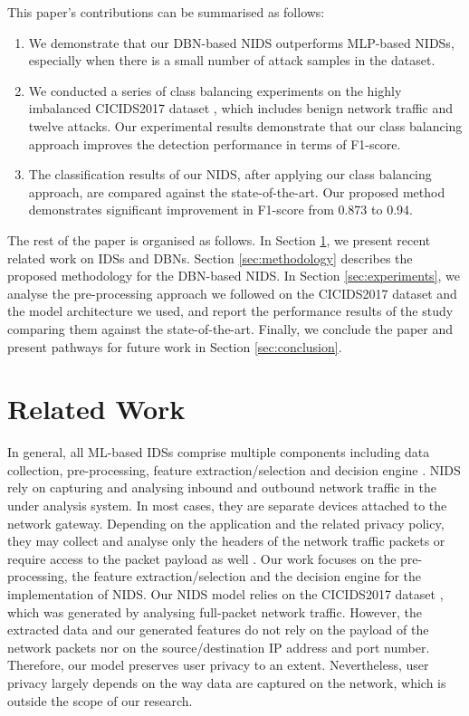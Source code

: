 \documentclass[runningheads]{llncs}
\begin{document}
This paper's contributions can be summarised as follows:
\begin{enumerate}
\item We demonstrate that our \ac{DBN}-based \ac{NIDS} outperforms \ac{MLP}-based \acp{NIDS}, especially when there is a small number of attack samples in the dataset.
\item We conducted a series of class balancing experiments on the highly imbalanced CICIDS2017 dataset \cite{Sharafaldin}, which includes benign network traffic and twelve attacks. Our experimental results demonstrate that our class balancing approach improves the detection performance in terms of F1-score.
\item The classification results of our \ac{NIDS}, after applying our class balancing approach, are compared against the state-of-the-art. Our proposed method demonstrates significant improvement in F1-score from 0.873 to 0.94.
\end{enumerate}

The rest of the paper is organised as follows. In Section \ref{sec:background and relwork}, we present recent related work on \acp{IDS} and \acp{DBN}. Section \ref{sec:methodology} describes the proposed methodology for the \ac{DBN}-based \ac{NIDS}. In Section \ref{sec:experiments}, we analyse the pre-processing approach we followed on the CICIDS2017 dataset and the model architecture we used, and report the performance results of the study comparing them against the state-of-the-art. Finally, we conclude the paper and present pathways for future work in Section \ref{sec:conclusion}.

 \section{Related Work}
\label{sec:background and relwork}

In general, all ML-based \acp{IDS} comprise multiple components including data collection, pre-processing, feature extraction/selection and decision engine \cite{Bridgesra}. \ac{NIDS} rely on capturing and analysing inbound and outbound network traffic in the under analysis system. In most cases, they are separate devices attached to the network gateway. Depending on the application and the related privacy policy, they may collect and analyse only the headers of the network traffic packets or require access to the packet payload as well  \cite{Matyasv}. Our work focuses on the pre-processing, the feature extraction/selection and the decision engine for the implementation of \ac{NIDS}. Our \ac{NIDS} model relies on the CICIDS2017 dataset \cite{Sharafaldin}, which was generated by analysing full-packet network traffic. However, the extracted data and our generated features do not rely on the payload of the network packets nor on the source/destination IP address and port number. Therefore, our model preserves user privacy to an extent. Nevertheless, user privacy largely depends on the way data are captured on the network, which is outside the scope of our research. 
\end{document}
